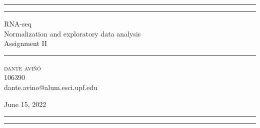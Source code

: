 \begin{titlepage} %
	
	\centering %
	
	
	\rule{\textwidth}{1pt} %
	\vspace{2pt}\vspace{-\baselineskip} %
	\rule{\textwidth}{0.4pt} %
	\vspace{0.1\textheight} %
	
	
	{
		{\Huge RNA-seq}\\[0.5\baselineskip] %
		{\Large Normalization and exploratory data analysis}\\[2\baselineskip] %
		{\Huge Assignment II} %
	}
	
	\vspace{0.025\textheight} %
	\rule{0.3\textwidth}{0.4pt} %
	\vspace{0.1\textheight} %
	
	
	{\Large \textsc{dante aviñó}}\\[0.5\baselineskip]
	{\large 106390}\\[0.5\baselineskip]%
	{\large dante.avino@alum.esci.upf.edu}
	\vfill %
	
	
	
	{\large{June 15, 2022}}
	
	\vspace{0.1\textheight} %
	
	
	\rule{\textwidth}{0.4pt} %
	\vspace{2pt}\vspace{-\baselineskip} %
	\rule{\textwidth}{1pt} %
	\vspace{1.8cm}
	
\end{titlepage}
